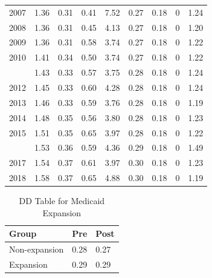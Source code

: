 \documentclass[
  12pt,
]{article}
\begin{document}
\begin{table}[H]
\begin{tabular}[t]{lrrrrrrrr}
2007 & 1.36 & 0.31 & 0.41 & 7.52 & 0.27 & 0.18 & 0 & 1.24\\
2008 & 1.36 & 0.31 & 0.45 & 4.13 & 0.27 & 0.18 & 0 & 1.20\\
2009 & 1.36 & 0.31 & 0.58 & 3.74 & 0.27 & 0.18 & 0 & 1.22\\
2010 & 1.41 & 0.34 & 0.50 & 3.74 & 0.27 & 0.18 & 0 & 1.22\\
\addlinespace
2011 & 1.43 & 0.33 & 0.57 & 3.75 & 0.28 & 0.18 & 0 & 1.24\\
2012 & 1.45 & 0.33 & 0.60 & 4.28 & 0.28 & 0.18 & 0 & 1.24\\
2013 & 1.46 & 0.33 & 0.59 & 3.76 & 0.28 & 0.18 & 0 & 1.19\\
2014 & 1.48 & 0.35 & 0.56 & 3.80 & 0.28 & 0.18 & 0 & 1.23\\
2015 & 1.51 & 0.35 & 0.65 & 3.97 & 0.28 & 0.18 & 0 & 1.22\\
\addlinespace
2016 & 1.53 & 0.36 & 0.59 & 4.36 & 0.29 & 0.18 & 0 & 1.49\\
2017 & 1.54 & 0.37 & 0.61 & 3.97 & 0.30 & 0.18 & 0 & 1.23\\
2018 & 1.58 & 0.37 & 0.65 & 4.88 & 0.30 & 0.18 & 0 & 1.19\\
\bottomrule
\end{tabular}
\end{table}

\newpage

\begin{table}[H]

\caption{\label{tab:dd-table}DD Table for Medicaid Expansion}
\centering
\begin{tabular}[t]{lll}
\toprule
Group & Pre & Post\\
\midrule
Non-expansion & 0.28 & 0.27\\
Expansion & 0.29 & 0.29\\
\bottomrule
\end{tabular}
\end{table}

\newpage
\end{document}
